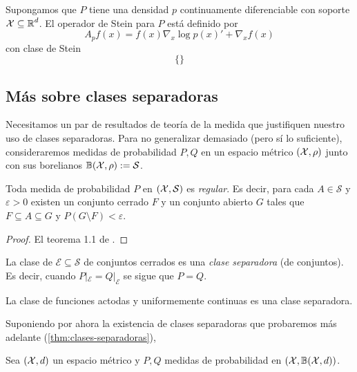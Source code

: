 \documentclass[main.tex]{subfiles}
\begin{document}
\begin{theorem}
    Supongamos que $P$ tiene una densidad $p$ continuamente diferenciable con soporte $\operatorname{\mathcal{X}} \subseteq \operatorname{\mathbb{R}}^d$. El operador de Stein para $P$ está definido por
    \begin{equation*}
        A_p f(x) = f(x)\nabla_x\log p(x)' + \nabla_xf(x) 
    \end{equation*}
    con clase de Stein
    \begin{equation*}
        \{\}
    \end{equation*}
\end{theorem}


\subsection{Más sobre clases separadoras}
Necesitamos un par de resultados de teoría de la medida que justifiquen nuestro uso de clases separadoras. Para no generalizar demasiado (pero sí lo suficiente), consideraremos medidas de probabilidad $P, Q$ en un espacio métrico $(\operatorname{\mathcal{X}}, \rho)$ junto con sus borelianos $\mathbb{B}(\operatorname{\mathcal{X}}, \rho) := \mathcal{S}$. 

\begin{lemma}
    Toda medida de probabilidad $P$ en $(\operatorname{\mathcal{X}}, \mathcal{S})$ es \textit{regular}. Es decir, para cada $A\in \mathcal{S}$ y $\varepsilon > 0$ existen un conjunto cerrado $F$ y un conjunto abierto $G$ tales que $F\subseteq A \subseteq G$ y $P(G\setminus F) < \varepsilon$.
\end{lemma}
\begin{proof}
    El teorema 1.1 de \cite{billingsley-convergence}.
\end{proof}

\begin{corollary}
    La clase de $\mathcal{E}\subseteq\mathcal{S}$ de conjuntos cerrados es una \textit{clase separadora} (de conjuntos). Es decir, cuando $P|_\mathcal{E} = Q|_\mathcal{E}$ se sigue que $P=Q$.
\end{corollary}

\begin{theorem}
    La clase de funciones actodas y uniformemente continuas es una clase separadora.
\end{theorem}

Suponiendo por ahora la existencia de clases separadoras que probaremos más adelante (\eqref{thm:clases-separadoras}),


\begin{theorem}\label{thm:clases-separadoras}
    Sea $(\operatorname{\mathcal{X}}, d)$ un espacio métrico y $P, Q$ medidas de probabilidad en $(\operatorname{\mathcal{X}}, \mathbb{B}(\operatorname{\mathcal{X}}, d))$.
\end{theorem}
\end{document}
